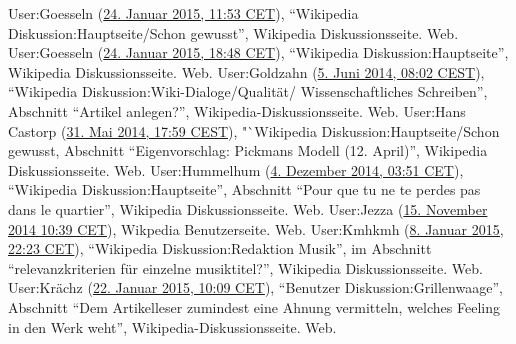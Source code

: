 \documentclass[fontsize=12pt]{scrartcl}
\begin{document}
{{{{\begin{thebibliography}
	User:Goesseln (\href{https://de.wikipedia.org/w/index.php?title=Wikipedia_Diskussion:Hauptseite/Schon_gewusst&diff=prev&oldid=138107562}{24. Januar 2015, 11:53 CET}), "`Wi\-ki\-pe\-dia Dis\-kus\-si\-on:Hauptseite/Schon gewusst"', Wi\-ki\-pe\-dia Dis\-kus\-si\-onsseite. Web.
	User:Goesseln (\href{https://de.wikipedia.org/w/index.php?title=Wikipedia_Diskussion:Hauptseite&diff=prev&oldid=138120673}{24. Januar 2015, 18:48 CET}), "`Wi\-ki\-pe\-dia Dis\-kus\-si\-on:Hauptseite"', Wi\-ki\-pe\-dia Dis\-kus\-si\-onsseite. Web.
	User:Goldzahn (\href{https://de.wikipedia.org/w/index.php?title=Wikipedia_Diskussion:Wiki-Dialoge\%2FQualit\%C3\%A4t\%2FWissenschaftliches_Schreiben\&diff=131040372\&oldid=131030900}{5. Juni 2014, 08:02 CEST}), "`Wi\-ki\-pe\-dia Dis\-kus\-si\-on:Wiki-Dialoge/Qualit\"at/ Wis\-senschaftliches Schrei\-ben"', Abschnitt "`Artikel anlegen?"', Wi\-ki\-pe\-dia-Dis\-kus\-si\-onsseite. Web.
	User:Hans Castorp (\href{https://de.wikipedia.org/w/index.php?title=Wikipedia\_Diskussion:Hauptseite/Schon\_gewusst\&diff=prev\&oldid=130907996}{31. Mai 2014, 17:59 CEST}), "`Wi\-ki\-pe\-dia Dis\-kus\-si\-on:Hauptseite/Schon gewusst, Abschnitt "`Eigenvorschlag: Pickmans Modell (12. April)"', Wi\-ki\-pe\-dia Dis\-kus\-si\-onsseite. Web.
	User:Hummelhum (\href{https://de.wikipedia.org/w/index.php?title=Wikipedia_Diskussion:Hauptseite\&diff=prev\&oldid=136449008}{4. Dezember 2014, 03:51 CET}), "`Wi\-ki\-pe\-dia Dis\-kus\-si\-on:\-Haupt\-sei\-te"', Abschnitt "`‎Pour que tu ne te perdes pas dans le quartier"', Wi\-ki\-pe\-dia Dis\-kus\-si\-onsseite. Web.
	User:Jezza (\href{https://de.wikipedia.org/w/index.php?title=Benutzer:Simplicius/Diderot-Club_II&diff=135838088&oldid=135786639}{15. November 2014 10:39 CET}), Wikpedia Be\-nut\-zer\-sei\-te. Web.
	User:Kmhkmh (\href{https://de.wikipedia.org/w/index.php?title=Wikipedia_Diskussion:Redaktion_Musik&diff=137580712&oldid=137579206}{8. Januar 2015, 22:23 CET}), "`Wi\-ki\-pe\-dia Dis\-kus\-si\-on:Redaktion Musik"', im Abschnitt "`relevanzkriterien f\"ur einzelne musiktitel?"', Wi\-ki\-pe\-dia Dis\-kus\-si\-onsseite. Web.
	User:Kr\"achz (\href{https://de.wikipedia.org/w/index.php?title=Benutzer_Diskussion:Grillenwaage\&diff=next\&oldid=138039032}{22. Januar 2015, 10:09 CET}), "`Be\-nut\-zer Dis\-kus\-si\-on:Grillenwaage"', Abschnitt "`Dem Artikelleser zumindest eine Ahnung vermitteln, welches \flq Feeling\frq \,\,in den Werk weht"', Wi\-ki\-pe\-dia-Dis\-kus\-si\-onsseite. Web.

\end{thebibliography}}}}}
\end{document}
